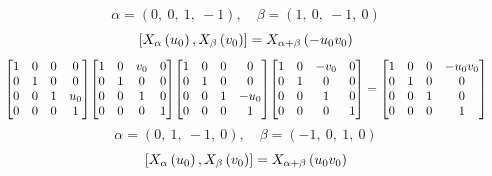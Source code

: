 \documentclass[11pt]{article}
\theoremstyle{definition}
\begin{document}
\[
\alpha = \left( 0, \  0, \  1, \  -1\right), \quad \beta = \left( 1, \  0, \  -1, \  0\right)
\]
\[
\scaletoalign{\textwidth}{\left[ X_{\alpha}\left(u_{0}\right), X_{\beta}\left(v_{0}\right) \right] = X_{\alpha + \beta}\left(- u_{0} v_{0}\right)}
\]
\[
\scaletoalign{\textwidth}{{\left[\begin{matrix}1 & 0 & 0 & 0\\0 & 1 & 0 & 0\\0 & 0 & 1 & u_{0}\\0 & 0 & 0 & 1\end{matrix}\right]} {\left[\begin{matrix}1 & 0 & v_{0} & 0\\0 & 1 & 0 & 0\\0 & 0 & 1 & 0\\0 & 0 & 0 & 1\end{matrix}\right]} {\left[\begin{matrix}1 & 0 & 0 & 0\\0 & 1 & 0 & 0\\0 & 0 & 1 & - u_{0}\\0 & 0 & 0 & 1\end{matrix}\right]} {\left[\begin{matrix}1 & 0 & - v_{0} & 0\\0 & 1 & 0 & 0\\0 & 0 & 1 & 0\\0 & 0 & 0 & 1\end{matrix}\right]} = {\left[\begin{matrix}1 & 0 & 0 & - u_{0} v_{0}\\0 & 1 & 0 & 0\\0 & 0 & 1 & 0\\0 & 0 & 0 & 1\end{matrix}\right]}}
\]
\[
\alpha = \left( 0, \  1, \  -1, \  0\right), \quad \beta = \left( -1, \  0, \  1, \  0\right)
\]
\[
\scaletoalign{\textwidth}{\left[ X_{\alpha}\left(u_{0}\right), X_{\beta}\left(v_{0}\right) \right] = X_{\alpha + \beta}\left(u_{0} v_{0}\right)}
\]
\end{document}
